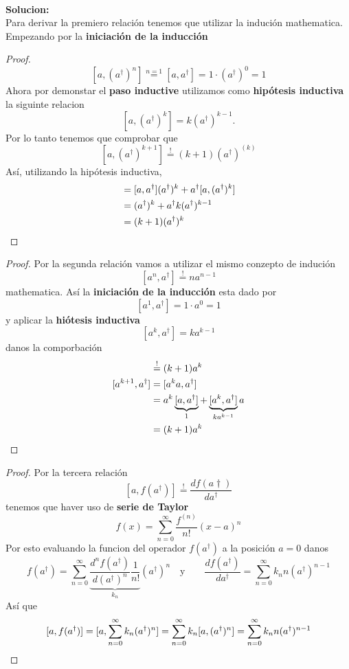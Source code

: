  \\
\textbf{Solucion:} \\
Para derivar la premiero relación tenemos que utilizar la indución mathematica.
Empezando por la \textbf{iniciación de la inducción}
\begin{proof}
$$
	[a, (a^\dagger)^n] \overset{n=1}{=} [a, a^\dagger] = 1 \cdot (a^\dagger)^0 =
1 
$$
Ahora por demonstar el \textbf{paso inductive} utilizamos como
\textbf{hipótesis inductiva} la siguinte relacion
$$
	[a, (a^\dagger)^k] = k (a^\dagger)^{k-1}.
$$
Por lo tanto tenemos que comprobar que
$$
	[a, (a^\dagger)^{k+1}] \overset{!}{=} (k+1) (a^\dagger)^{(k)}
$$
Así, utilizando la hipótesis inductiva,
\begin{align*}
	[a, a^\dagger (a^\dagger)^k] &= [a, a^\dagger] (a^\dagger)^k + a^\dagger [a,
(a^\dagger)^k] \\
	&= (a^\dagger)^k + a^\dagger k (a^\dagger)^{k-1} \\
	&= (k+1)(a^\dagger)^k \qedhere
\end{align*}
\end{proof}
\begin{proof}
Por la segunda relación vamos a utilizar el mismo conzepto de indución
$$
	[a^n, a^\dagger] \overset{!}{=} n a^{n-1}
$$
mathematica. Así la \textbf{iniciación de la inducción} esta dado por
$$
	[a^1, a^\dagger] = 1 \cdot a^0 = 1
$$
y aplicar la \textbf{hiótesis inductiva} 
$$
	[a^k, a^\dagger] = k a^{k-1}
$$
danos la comporbación
\begin{align*}
	[a^{k+1}, a^\dagger] &\overset{!}{=} (k+1)a^k \\
	[a^{k+1}, a^\dagger] &= [a^k a, a^\dagger] \\
	&=	a^k \underbrace{[a, a^\dagger]}_1 + \underbrace{[a^k,
a^\dagger]}_{ka^{k-1}} a \\
	&= (k+1)a^k \qedhere
\end{align*}
\end{proof}
\begin{proof}
Por la tercera relación
$$
	[a, f(a^\dagger)] \overset{!}{=} \frac{d f(a\dagger)}{d a^\dagger}
$$
tenemos que haver uso de \textbf{serie de Taylor}
$$
	f(x) = \sum_{n=0}^\infty \frac{f^(n)}{n!}(x-a)^n
$$
Por esto evaluando la funcion del operador $f(a^\dagger)$ a la posición $a=0$
danos
$$
	f(a^\dagger) = \sum_{n=0}^\infty \underbrace{\frac{d^n f(a^\dagger)}{d
(a^\dagger)^n} \frac{1}{n!}}_{k_n} (a^\dagger)^n \quad \text{y} \qquad \frac{d
f(a^\dagger)}{d a^\dagger} = \sum_{n=0}^\infty k_n n (a^\dagger)^{n-1}
$$
Así que
$$
	[a, f(a^\dagger)] = [a, \sum_{n=0}^\infty k_n (a^\dagger)^n ] =
\sum_{n=0}^\infty k_n [a, (a^\dagger)^n] = \sum_{n=0}^\infty k_n
n(a^\dagger)^{n-1} \qedhere
$$
\end{proof}
